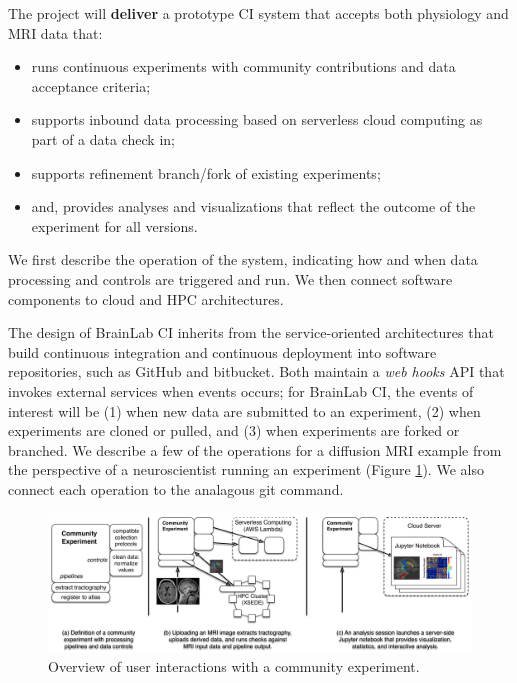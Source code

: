 The project will {\bf deliver} a prototype CI system that accepts both physiology and MRI data that:
\begin{itemize}
\vspace{-7pt}
\addtolength{\itemsep}{-7pt}
  \item runs continuous experiments with community contributions and data acceptance criteria;
  \item supports inbound data processing based on serverless cloud computing as part of a data check in;
  \item supports refinement branch/fork of existing experiments;
  \item and, provides analyses and visualizations that reflect the outcome of the experiment for all versions. 
\vspace{-10pt}
\end{itemize}
We first describe the operation of the system, indicating how and when data processing and 
controls are triggered and run.  We then connect software components to cloud and HPC
architectures. 


%
The design of BrainLab CI inherits from the service-oriented architectures 
that build continuous integration and continuous deployment into software repositories,
such as \textsf{GitHub} and \textsf{bitbucket}.
Both maintain a \emph{web hooks} API that invokes external services when events
occurs; for BrainLab CI, the events of interest will be (1) when new data are submitted 
to an experiment, (2) when experiments are cloned or pulled, and 
(3) when experiments are forked or branched.
We describe a few of the operations for a diffusion MRI example 
from the perspective 
of a neuroscientist running an experiment (Figure \ref{fig:services}). We also 
connect each operation to the analagous git command.

\begin{figure}
  \begin{center}
    \hspace{-10pt}
    \includegraphics[width=6.7in]{blcifig.pdf}
  \caption{\small Overview of user interactions with a community experiment.}
  \label{fig:services}
  \end{center}
\end{figure}

